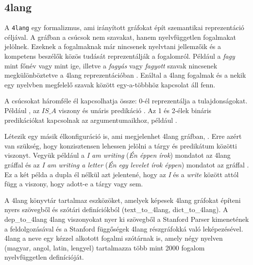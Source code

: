 \subsection{4lang}
\label{sec:4lang}
A \texttt{4lang}  \cite{Kornai:2015} egy formalizmus, ami irányított gráfokat épít szemantikai reprezentáció céljával. A gráfban a csúcsok nem szavakat, hanem nyelvfüggetlen fogalmakat jelölnek. Ezeknek a fogalmaknak már nincsenek nyelvtani jellemzőik és a kompetens beszélők közös tudását reprezentálják a fogalomról. Például a \textit{fagy} mint főnév vagy mint ige, illetve a \textit{fagyás} vagy \textit{fagyott} szavak nincsenek megkülönböztetve a 4lang reprezentációban \cite{Recski:2018}. Ezáltal a 4lang fogalmak és a nekik egy nyelvben megfelelő szavak között egy-a-többhöz kapcsolat áll fenn.

A csúcsokat háromféle él kapcsolhatja össze:
0-él reprezentálja a tulajdonságokat. Például , az \textit{$IS\_A$} viszony  és unáris predikáció .
Az 1 és 2-élek bináris predikációkat kapcsolnak az argumentumaikhoz, például .

Létezik egy másik élkonfiguráció is, ami megjelenhet 4lang gráfban,  . Erre azért van szükség, hogy konzisztensen lehessen jelölni a tárgy és predikátum közötti viszonyt. Vegyük például a \textit{I am writing} (\textit{Én éppen írok})  mondatot az  4lang gráffal és az \textit{I am writing a letter} (\textit{Én egy levelet írok éppen}) mondatot az  gráffal . Ez a két példa a dupla él nélkül azt jelentené, hogy  az \textit{I} és a \textit{write} között attól függ a viszony, hogy adott-e a tárgy vagy sem. \cite{Recski:2018}

A 4lang könyvtár tartalmaz eszközöket, amelyek képesek 4lang gráfokat építeni nyers szövegből és szótári definíciókból (text\_to\_4lang, dict\_to\_4lang). A dep\_to\_4lang 4lang viszonyokat nyer ki szövegből a Stanford Parser \cite{deMarneffe:2008} kimenetének a feldolgozásával és a Stanford függőségek 4lang részgráfokká való leképezésével.
4lang a neve egy kézzel alkotott  fogalmi szótárnak is, amely négy nyelven (magyar, angol, latin, lengyel) tartalmazza több mint 2000 fogalom nyelvfüggetlen definícióját. \cite{Kornai:2013}


